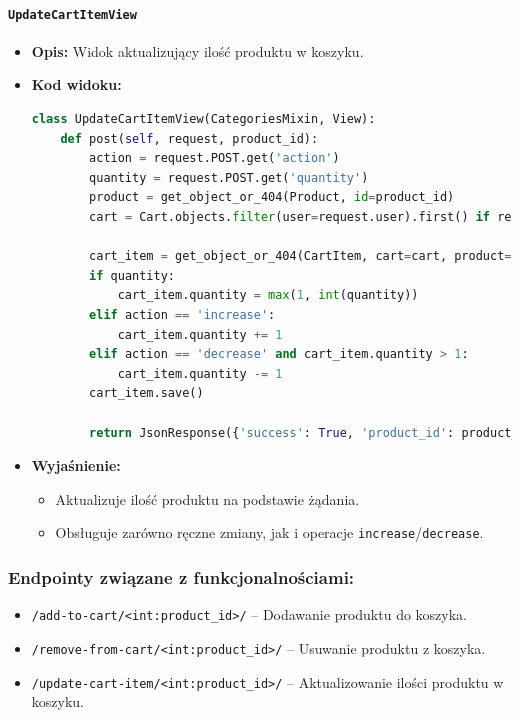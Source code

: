 \documentclass[12pt,a4paper,oneside]{article}
\theoremstyle{definition}
\numberwithin{equation}{section}
\begin{document}
\paragraph{\texttt{UpdateCartItemView}}
\begin{itemize}
    \item \textbf{Opis:} Widok aktualizujący ilość produktu w koszyku.
    \item \textbf{Kod widoku:}
\begin{lstlisting}[language=Python, caption=Kod widoku UpdateCartItemView]
class UpdateCartItemView(CategoriesMixin, View):
    def post(self, request, product_id):
        action = request.POST.get('action')
        quantity = request.POST.get('quantity')
        product = get_object_or_404(Product, id=product_id)
        cart = Cart.objects.filter(user=request.user).first() if request.user.is_authenticated else Cart.objects.filter(id=request.session.get('cart_id')).first()

        cart_item = get_object_or_404(CartItem, cart=cart, product=product)
        if quantity:
            cart_item.quantity = max(1, int(quantity))
        elif action == 'increase':
            cart_item.quantity += 1
        elif action == 'decrease' and cart_item.quantity > 1:
            cart_item.quantity -= 1
        cart_item.save()

        return JsonResponse({'success': True, 'product_id': product_id, 'quantity': cart_item.quantity})
\end{lstlisting}

    \item \textbf{Wyjaśnienie:}
    \begin{itemize}
        \item Aktualizuje ilość produktu na podstawie żądania.
        \item Obsługuje zarówno ręczne zmiany, jak i operacje \texttt{increase}/\texttt{decrease}.
    \end{itemize}
\end{itemize}


\subsubsection{Endpointy związane z funkcjonalnościami:}
\begin{itemize}
    \item \texttt{/add-to-cart/<int:product\_id>/} – Dodawanie produktu do koszyka.
    \item \texttt{/remove-from-cart/<int:product\_id>/} – Usuwanie produktu z koszyka.
    \item \texttt{/update-cart-item/<int:product\_id>/} – Aktualizowanie ilości produktu w koszyku.
\end{itemize}
\end{document}
